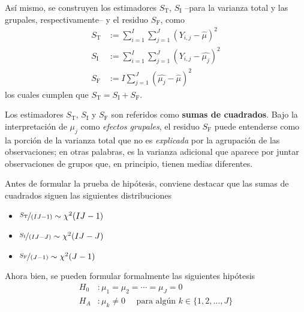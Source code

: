\documentclass[12pt,letterpaper]{book}
\begin{document}

Así mismo, se construyen los estimadores $S_{\text{T}}$, $S_{\text{I}}$ --para la varianza total y las grupales, respectivamente-- y el residuo $S_{\text{F}}$, como
\begin{align}
S_{\text{T}}  &{:=} \sum_{i = 1}^{I} \sum_{j = 1}^{J} \left( Y_{i,j} - \widehat{\mu} \right)^2 \\
S_{\text{I}} &{:=} \sum_{i = 1}^{I} \sum_{j = 1}^{J} \left( Y_{i,j} - \widehat{\mu_j} \right)^2 \\
S_{\text{F}} &{:=} I \sum_{j = 1}^{J} \left( \widehat{\mu_j} - \widehat{\mu} \right)^2
\end{align}
los cuales cumplen que $S_{\text{T}} = S_{\text{I}} + S_{\text{F}}$.

Los estimadores $S_{\text{T}}$, $S_{\text{I}}$ y $S_{\text{F}}$ son referidos como \textbf{sumas de cuadrados}. 
%
Bajo la interpretación de $\mu_j$ como \textit{efectos grupales}, el residuo $S_{\text{F}}$ puede entenderse como la porción de la varianza total que no es \textit{explicada} por la agrupación de las observaciones; en otras palabras, es la varianza adicional que aparece por juntar observaciones de grupos que, en principio, tienen medias diferentes.


Antes de formular la prueba de hipótesis, conviene destacar que las sumas de cuadrados siguen las siguientes distribuciones 
\begin{itemize}
\item $\nicefrac{S_{\text{T}}}{(I J - 1)} \sim \chi^2(I J - 1)$
\item $\nicefrac{S_{\text{I}}}{(I J - J)} \sim \chi^2(I J - J)$
\item $\nicefrac{S_{\text{F}}}{(J - 1)} \sim \chi^2(J - 1)$
\end{itemize}

Ahora bien, se pueden formular formalmente las siguientes hipótesis
\begin{align}
H_0 &: \mu_1 = \mu_2 = \cdots = \mu_J = 0 \\
H_A &: \mu_k \neq 0 \quad \text{ para algún } k \in \{ 1, 2, \dots, J \}
\end{align}
\end{document}

